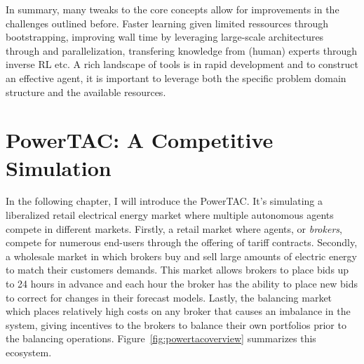 In summary, many tweaks to the core concepts allow for improvements in the challenges outlined before. Faster learning given limited
ressources through bootstrapping, improving wall time by leveraging large-scale architectures through and
parallelization, transfering knowledge from (human) experts through inverse \ac{RL} etc. A rich landscape of tools is
in rapid development and to construct an effective agent, it is important to leverage both the specific problem domain
structure and the available resources.



\section{PowerTAC: A Competitive Simulation}%
\label{sec:powertac_a_competitive_simulation}




In the following chapter, I will introduce the \acf{PowerTAC}. It's simulating a liberalized retail electrical energy
market where multiple autonomous agents compete in different markets. Firstly, a retail market where agents, or
\emph{brokers}, compete for numerous end-users through the offering of tariff contracts. Secondly, a wholesale market in
which brokers buy and sell large amounts of electric energy to match their customers demands. This market allows brokers
to place bids up to 24 hours in advance and each hour the broker has the ability to place new bids to correct for
changes in their forecast models. Lastly, the balancing market which places relatively high costs on any broker that
causes an imbalance in the system, giving incentives to the brokers to balance their own portfolios prior to the
balancing operations. Figure~\ref{fig:powertacoverview} summarizes this ecosystem.

